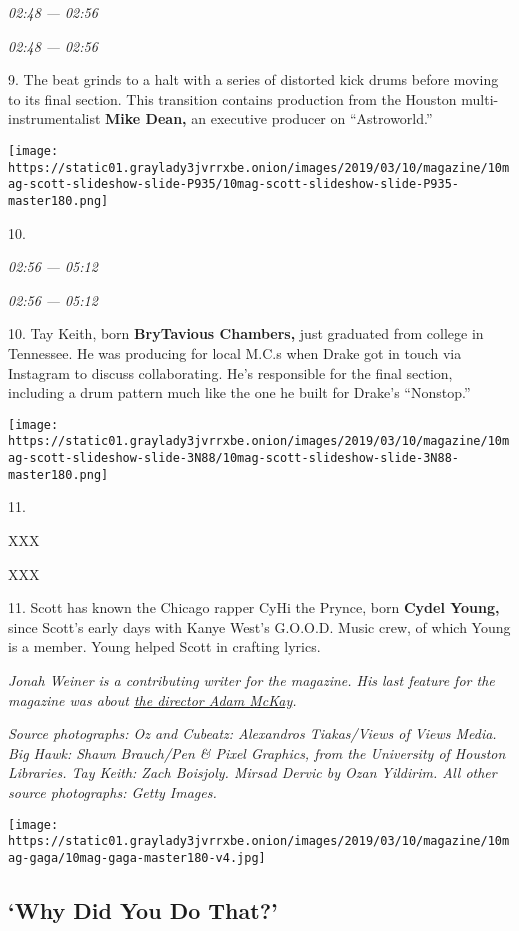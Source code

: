 \emph{02:48} \emph{--- 02:56}

\emph{02:48} \emph{--- 02:56}

9. The beat grinds to a halt with a series of distorted kick drums
before moving to its final section. This transition contains production
from the Houston multi-instrumentalist \textbf{Mike Dean,} an executive
producer on ``Astroworld.''

\texttt{[image: https://static01.graylady3jvrrxbe.onion/images/2019/03/10/magazine/10mag-scott-slideshow-slide-P935/10mag-scott-slideshow-slide-P935-master180.png]}

10.

\emph{02:56} \emph{--- 05:12}

\emph{02:56} \emph{--- 05:12}

10. Tay Keith, born \textbf{BryTavious Chambers,} just graduated from
college in Tennessee. He was producing for local M.C.s when Drake got in
touch via Instagram to discuss collaborating. He's responsible for the
final section, including a drum pattern much like the one he built for
Drake's ``Nonstop.''

\texttt{[image: https://static01.graylady3jvrrxbe.onion/images/2019/03/10/magazine/10mag-scott-slideshow-slide-3N88/10mag-scott-slideshow-slide-3N88-master180.png]}

11.

XXX

XXX

11. Scott has known the Chicago rapper CyHi the Prynce, born
\textbf{Cydel Young,} since Scott's early days with Kanye West's
G.O.O.D. Music crew, of which Young is a member. Young helped Scott in
crafting lyrics.

\emph{Jonah Weiner is a contributing writer for the magazine. His last
feature for the magazine was about
\href{https://www.nytimes3xbfgragh.onion/2018/11/29/magazine/adam-mckay-dick-cheney-vice.html}{the
director Adam McKay}.}

\emph{Source photographs: Oz and Cubeatz: Alexandros Tiakas/Views of
Views Media. Big Hawk: Shawn Brauch/Pen \& Pixel Graphics, from the
University of Houston Libraries. Tay Keith: Zach Boisjoly. Mirsad Dervic
by Ozan Yildirim. All other source photographs: Getty Images.}

\texttt{[image: https://static01.graylady3jvrrxbe.onion/images/2019/03/10/magazine/10mag-gaga/10mag-gaga-master180-v4.jpg]}

\hypertarget{--why-did-you-do-that}{%
\subsection{\texorpdfstring{ `Why Did You Do
That?'}{  `Why Did You Do That?'}}\label{--why-did-you-do-that}}

